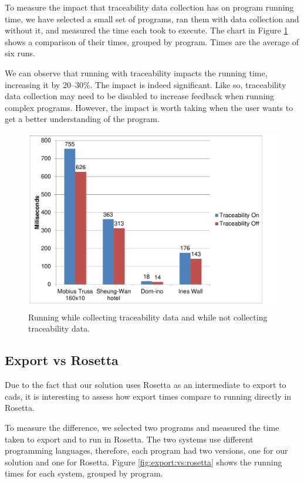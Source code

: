To measure the impact that traceability data collection has on program running time, we have selected a small set of programs, ran them with data collection and without it, and measured the time each took to execute.
The chart in Figure \ref{fig:traceability:timing} shows a comparison of their times, grouped by program.
Times are the average of six runs.

We can observe that running with traceability impacts the running time, increasing it by 20--30\%.
The impact is indeed significant.
Like so, traceability data collection may need to be disabled to increase feedback when running complex programs.
However, the impact is worth taking when the user wants to get a better understanding of the program.

\begin{figure}
  \centering
  \includegraphics[width=12cm]{./images/traceability_timing}
  \caption{Running while collecting traceability data and while not collecting traceability data.}
  \label{fig:traceability:timing}
\end{figure}


\subsection{Export vs Rosetta}
Due to the fact that our solution uses Rosetta as an intermediate to export to \glspl{cad}, it is interesting to assess how export times compare to running directly in Rosetta.

To measure the difference, we selected two programs and measured the time taken to export and to run in Rosetta.
The two systems use different programming languages, therefore, each program had two versions, one for our solution and one for Rosetta.
Figure \ref{fig:export:vs:rosetta} shows the running times for each system, grouped by program.

